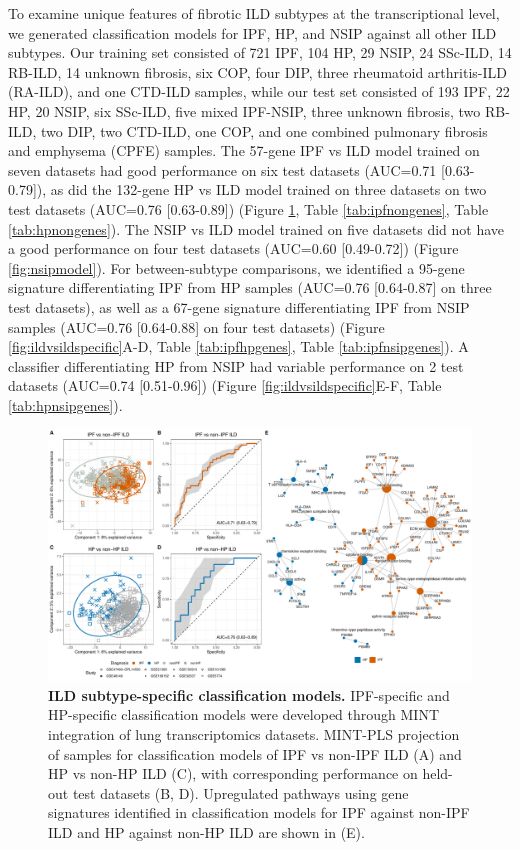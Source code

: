 \documentclass[
]{article}
\begin{document}
To examine unique features of fibrotic ILD subtypes at the transcriptional level, we generated classification models for IPF, HP, and NSIP against all other ILD subtypes. Our training set consisted of 721 IPF, 104 HP, 29 NSIP, 24 SSc-ILD, 14 RB-ILD, 14 unknown fibrosis, six COP, four DIP, three rheumatoid arthritis-ILD (RA-ILD), and one CTD-ILD samples, while our test set consisted of 193 IPF, 22 HP, 20 NSIP, six SSc-ILD, five mixed IPF-NSIP, three unknown fibrosis, two RB-ILD, two DIP, two CTD-ILD, one COP, and one combined pulmonary fibrosis and emphysema (CPFE) samples. The 57-gene IPF vs ILD model trained on seven datasets had good performance on six test datasets (AUC=0.71 {[}0.63-0.79{]}), as did the 132-gene HP vs ILD model trained on three datasets on two test datasets (AUC=0.76 {[}0.63-0.89{]}) (Figure \ref{fig:ILDvILD}, Table \ref{tab:ipfnongenes}, Table \ref{tab:hpnongenes}). The NSIP vs ILD model trained on five datasets did not have a good performance on four test datasets (AUC=0.60 {[}0.49-0.72{]}) (Figure \ref{fig:nsipmodel}). For between-subtype comparisons, we identified a 95-gene signature differentiating IPF from HP samples (AUC=0.76 {[}0.64-0.87{]} on three test datasets), as well as a 67-gene signature differentiating IPF from NSIP samples (AUC=0.76 {[}0.64-0.88{]} on four test datasets) (Figure \ref{fig:ildvsildspecific}A-D, Table \ref{tab:ipfhpgenes}, Table \ref{tab:ipfnsipgenes}). A classifier differentiating HP from NSIP had variable performance on 2 test datasets (AUC=0.74 {[}0.51-0.96{]}) (Figure \ref{fig:ildvsildspecific}E-F, Table \ref{tab:hpnsipgenes}).



\begin{figure}

{\centering \includegraphics[width=0.95\linewidth,]{./Figures/SysReview/Figure4_ILDvsILD} 

}

\caption[ILD vs ILD models]{\textbf{ILD subtype-specific classification models.} IPF-specific and HP-specific classification models were developed through MINT integration of lung transcriptomics datasets. MINT-PLS projection of samples for classification models of IPF vs non-IPF ILD (A) and HP vs non-HP ILD (C), with corresponding performance on held-out test datasets (B, D). Upregulated pathways using gene signatures identified in classification models for IPF against non-IPF ILD and HP against non-HP ILD are shown in (E).}\label{fig:ILDvILD}
\end{figure}
\end{document}
